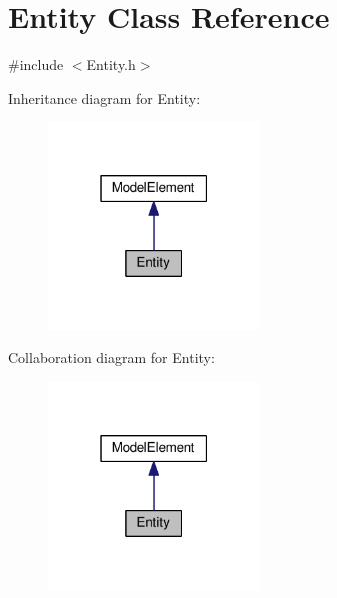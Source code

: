 \hypertarget{class_entity}{}\section{Entity Class Reference}
\label{class_entity}


{\ttfamily \#include $<$Entity.\+h$>$}



Inheritance diagram for Entity\+:\nopagebreak
\begin{figure}[H]
\begin{center}
\leavevmode
\includegraphics[width=159pt]{class_entity__inherit__graph}
\end{center}
\end{figure}


Collaboration diagram for Entity\+:\nopagebreak
\begin{figure}[H]
\begin{center}
\leavevmode
\includegraphics[width=159pt]{class_entity__coll__graph}
\end{center}
\end{figure}
